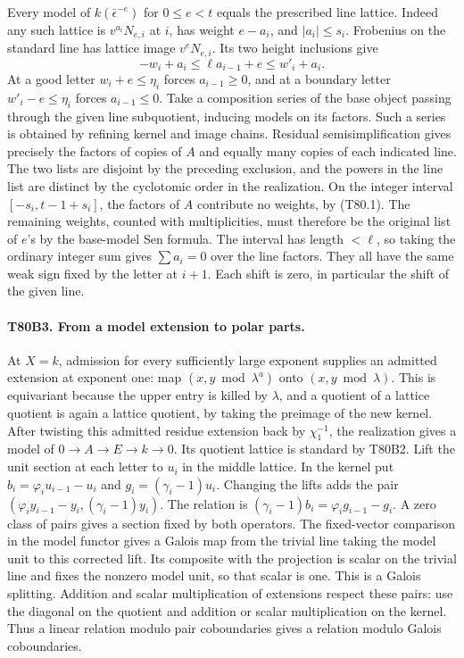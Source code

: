 Every model of $k(\bar\epsilon^{-e})$ for $0\le e<t$ equals the
prescribed line lattice. Indeed any such lattice is $v^{a_i}N_{e,i}$
at $i$, has weight $e-a_i$, and $|a_i|\le s_i$. Frobenius on the
standard line has lattice image $v^eN_{e,i}$. Its two height inclusions give
\[
 -w_i+a_i\le\ell a_{i-1}+e\le w'_i+a_i .
\]
At a good letter $w_i+e\le\eta_i$ forces $a_{i-1}\ge0$, and at a
boundary letter $w'_i-e\le\eta_i$ forces $a_{i-1}\le0$.
Take a composition series of the base object passing through the given
line subquotient, inducing models on its factors. Such a series is
obtained by refining kernel and image chains. Residual semisimplification
gives precisely the factors of copies of $A$ and equally many copies of
each indicated line. The two lists are disjoint by the preceding exclusion,
and the powers in the line list are distinct by the cyclotomic order in
the realization. On the integer interval $[-s_i,t-1+s_i]$, the factors
of $A$ contribute no weights, by (T80.1). The remaining weights, counted
with multiplicities, must therefore be the original list of $e$'s by
the base-model Sen formula. The interval has length $<\ell$, so taking
the ordinary integer sum gives $\sum a_i=0$ over the line factors.
They all have the same weak sign fixed by the letter at $i+1$. Each shift
is zero, in particular the shift of the given line.

\paragraph{T80B3. From a model extension to polar parts.}
At $X=k$, admission for every sufficiently large exponent supplies an
admitted extension at exponent one: map $(x,y\bmod\lambda^a)$ onto
$(x,y\bmod\lambda)$. This is equivariant because the upper entry is
killed by $\lambda$, and a quotient of a lattice quotient is again a
lattice quotient, by taking the preimage of the new kernel.
After twisting this admitted residue extension back by $\chi_1^{-1}$,
the realization gives a model of $0\to A\to E\to k\to0$.
Its quotient lattice is standard by T80B2. Lift the unit section at
each letter to $u_i$ in the middle lattice. In the kernel put
$b_i=\varphi_i u_{i-1}-u_i$ and $g_i=(\gamma_i-1)u_i$.
Changing the lifts adds the pair
$(\varphi_i y_{i-1}-y_i,(\gamma_i-1)y_i)$. The relation is
$(\gamma_i-1)b_i=\varphi_i g_{i-1}-g_i$. A zero class of pairs gives
a section fixed by both operators. The fixed-vector comparison
in the model functor gives a Galois map from the trivial line taking
the model unit to this corrected lift. Its composite with the
projection is scalar on the trivial line and fixes the nonzero model
unit, so that scalar is one. This is a Galois splitting.
Addition and scalar multiplication of extensions respect these pairs:
use the diagonal on the quotient and addition or scalar multiplication on
the kernel. Thus a linear relation modulo pair coboundaries gives a
relation modulo Galois coboundaries.

